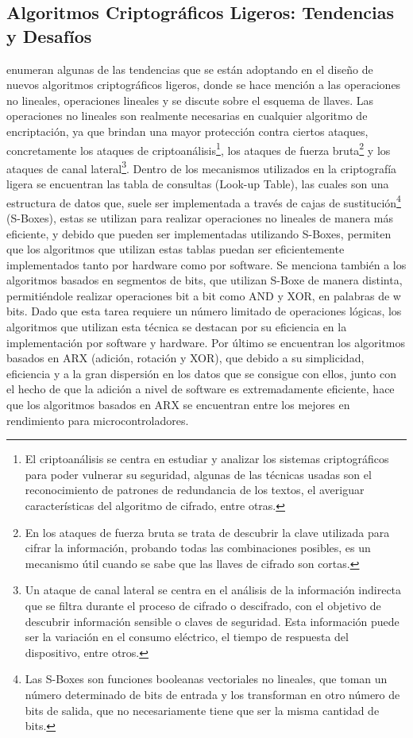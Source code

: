 \documentclass[a4paper,10pt]{article}
\begin{document}
	\subsection{Algoritmos Criptográficos Ligeros: Tendencias y Desafíos}
	\textcite{biryukov2017state} enumeran algunas de las tendencias que se están adoptando en el diseño de nuevos algoritmos criptográficos ligeros, donde se hace mención a las operaciones no lineales, operaciones lineales y se discute sobre el esquema de llaves.
	Las operaciones no lineales son realmente necesarias en cualquier algoritmo de encriptación, ya que brindan una mayor protección contra ciertos ataques, concretamente los ataques de criptoanálisis\footnote{El criptoanálisis se centra en estudiar y analizar los sistemas criptográficos para poder vulnerar su seguridad, algunas de las técnicas usadas son el reconocimiento de patrones de redundancia de los textos, el averiguar características del algoritmo de cifrado, entre otras.}, los ataques de fuerza bruta\footnote{En los ataques de fuerza bruta se trata de descubrir la clave utilizada para cifrar la información, probando todas las combinaciones posibles, es un mecanismo útil cuando se sabe que las llaves de cifrado son cortas.} y los ataques de canal lateral\footnote{Un ataque de canal lateral se centra en el análisis de la información indirecta que se filtra durante el proceso de cifrado o descifrado, con el objetivo de descubrir información sensible o claves de seguridad. Esta información puede ser la variación en el consumo eléctrico, el tiempo de respuesta del dispositivo, entre otros.}. Dentro de los mecanismos utilizados en la criptografía ligera se encuentran las tabla de consultas (Look-up Table), las cuales son una estructura de datos que, suele ser implementada a través de cajas de sustitución\footnote{Las S-Boxes son funciones booleanas vectoriales no lineales, que toman un número determinado de bits de entrada y los transforman en otro número de bits de salida, que no necesariamente tiene que ser la misma cantidad de bits.} (S-Boxes), estas se utilizan para realizar operaciones no lineales de manera más eficiente, y debido que pueden ser implementadas utilizando S-Boxes, permiten que los algoritmos que utilizan estas tablas puedan ser eficientemente implementados tanto por hardware como por software. Se menciona también a los algoritmos basados en segmentos de bits, que utilizan S-Boxe de manera distinta, permitiéndole realizar operaciones bit a bit como AND y XOR, en palabras de w bits. Dado que esta tarea requiere un número limitado de operaciones lógicas, los algoritmos que utilizan esta técnica se destacan por su eficiencia en la implementación por software y hardware. Por último se encuentran los algoritmos basados en ARX (adición, rotación y XOR), que debido a su simplicidad, eficiencia y a la gran dispersión en los datos que se consigue con ellos, junto con el hecho de que la adición a nivel de software es extremadamente eficiente, hace que los algoritmos basados en ARX se encuentran entre los mejores en rendimiento para microcontroladores.
\end{document}
